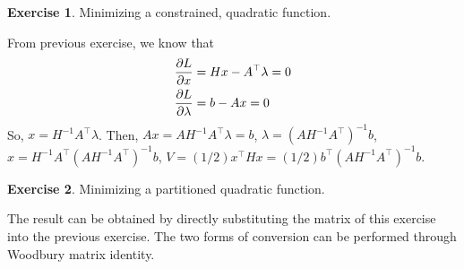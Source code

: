 \documentclass[11pt,a4paper]{report}
\theoremstyle{definition}\newtheorem{exercise}{Exercise}[chapter]
\begin{document}
\begin{exercise}Minimizing a constrained, quadratic function.\\
\end{exercise}
\begin{answer}
From previous exercise, we know that 
\begin{align}
    \pdv{L}{x}&=Hx-A^\top\lambda=0\\
    \pdv{L}{\lambda}&=b-Ax=0
\end{align}
So, $x=H^{-1}A^\top\lambda$. Then, $Ax=AH^{-1}A^\top\lambda=b$, $\lambda=(AH^{-1}A^\top)^{-1}b$, $x=H^{-1}A^\top(AH^{-1}A^\top)^{-1}b$, $V=(1/2)x^\top Hx=(1/2)b^\top(AH^{-1}A^\top)^{-1}b$.
\end{answer}


\begin{exercise}Minimizing a partitioned quadratic function.\\
\end{exercise}
\begin{answer}
The result can be obtained by directly substituting the matrix of this exercise into the previous exercise. The two forms of conversion can be performed through Woodbury matrix identity.
\end{answer}
\end{document}
